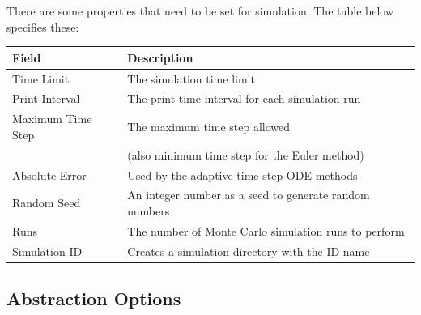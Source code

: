 \documentclass[titlepage,11pt]{article}
\begin{document}
There are some properties that need to be set for simulation.
The table below specifies these:

\begin{center}
\begin{tabular}{|l|l|}
\hline
Field             & Description \\ \hline \hline
Time Limit        & The simulation time limit \\ \hline
Print Interval    & The print time interval for each simulation run \\ \hline
Maximum Time Step & The maximum time step allowed \\ 
      ~           & (also minimum time step for the Euler method) \\ \hline
Absolute Error    & Used by the adaptive time step ODE methods \\ \hline
Random Seed       & An integer number as a seed to generate random
numbers \\ \hline
Runs              & The number of Monte Carlo simulation runs to
perform \\ \hline
Simulation ID     & Creates a simulation directory with the ID name \\ \hline
\end{tabular}
\end{center}

% 

\clearpage

\subsection{\label{absOptions}Abstraction Options}
\end{document}
